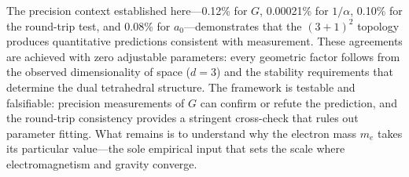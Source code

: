 The precision context established here---0.12\% for $G$, 0.00021\% for $1/\alpha$, 0.10\% for the round-trip test, and 0.08\% for $a_0$---demonstrates that the $(3+1)^2$ topology produces quantitative predictions consistent with measurement. These agreements are achieved with zero adjustable parameters: every geometric factor follows from the observed dimensionality of space ($d = 3$) and the stability requirements that determine the dual tetrahedral structure. The framework is testable and falsifiable: precision measurements of $G$ can confirm or refute the prediction, and the round-trip consistency provides a stringent cross-check that rules out parameter fitting. What remains is to understand why the electron mass $m_e$ takes its particular value---the sole empirical input that sets the scale where electromagnetism and gravity converge.
